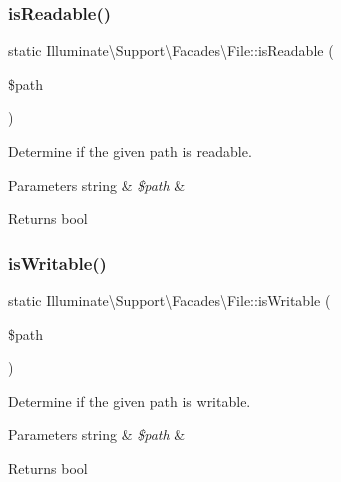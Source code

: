 \subsubsection{\texorpdfstring{is\+Readable()}{isReadable()}}
{\footnotesize\ttfamily static Illuminate\textbackslash{}\+Support\textbackslash{}\+Facades\textbackslash{}\+File\+::is\+Readable (\begin{DoxyParamCaption}\item[{}]{\$path }\end{DoxyParamCaption})\hspace{0.3cm}{\ttfamily [static]}}

Determine if the given path is readable.


\begin{DoxyParams}[1]{Parameters}
string & {\em \$path} & \\
\hline
\end{DoxyParams}
\begin{DoxyReturn}{Returns}
bool 
\end{DoxyReturn}
\mbox{\label{class_illuminate_1_1_support_1_1_facades_1_1_file_aca7ac18b51c114d25ac774b8d2b2324b}} 
\subsubsection{\texorpdfstring{is\+Writable()}{isWritable()}}
{\footnotesize\ttfamily static Illuminate\textbackslash{}\+Support\textbackslash{}\+Facades\textbackslash{}\+File\+::is\+Writable (\begin{DoxyParamCaption}\item[{}]{\$path }\end{DoxyParamCaption})\hspace{0.3cm}{\ttfamily [static]}}

Determine if the given path is writable.


\begin{DoxyParams}[1]{Parameters}
string & {\em \$path} & \\
\hline
\end{DoxyParams}
\begin{DoxyReturn}{Returns}
bool 
\end{DoxyReturn}
\mbox{\label{class_illuminate_1_1_support_1_1_facades_1_1_file_a96eb9c1ffc4aabed4d270ac6eb3605d6}} 
